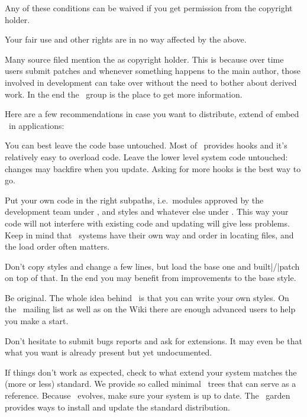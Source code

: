 Any of these conditions can be waived if you get permission from the copyright
holder.

Your fair use and other rights are in no way affected by the above.
\stopcolor

Many source filed mention the  as
copyright holder. This is because over time users submit patches and whenever
something happens to the main author, those involved in development can take
over without the need to bother about derived work. In the end the \CONTEXT\
group is the place to get more information.

\stopsubject

\startsubject[title={Recommendations}]

Here are a few recommendations in case you want to distribute, extend of embed
\CONTEXT\ in applications:

\startitemize

\startitem
    You can best leave the code base untouched. Most of \CONTEXT\ provides hooks
    and it's relatively easy to overload code. Leave the lower level system code
    untouched: changes may backfire when you update. Asking for more hooks is the
    best way to go.
\stopitem

\startitem
    Put your own code in the right subpaths, i.e.\ modules approved by the
    development team under \type {.../third}, and styles and whatever else under
    \type {.../user}. This way your code will not interfere with existing code
    and updating will give less problems. Keep in mind that \TEX\ systems have
    their own way and order in locating files, and the load order often matters.
\stopitem

\startitem
    Don't copy styles and change a few lines, but load the base one and
    built|/|patch on top of that. In the end you may benefit from improvements to
    the base style.
\stopitem

\startitem
    Be original. The whole idea behind \CONTEXT\ is that you can write your own
    styles. On the \CONTEXT\ mailing list as well as on the Wiki there are enough
    advanced users to help you make a start.
\stopitem

\startitem
    Don't hesitate to submit bugs reports and ask for extensions. It may even be
    that what you want is already present but yet undocumented.
\stopitem

\startitem
    If things don't work as expected, check to what extend your system matches
    the (more or less) standard. We provide so called minimal \CONTEXT\ trees
    that can serve as a reference. Because \CONTEXT\ evolves, make sure your
    system is up to date. The \CONTEXT\ garden provides ways to install and
    update the standard distribution.
\stopitem

